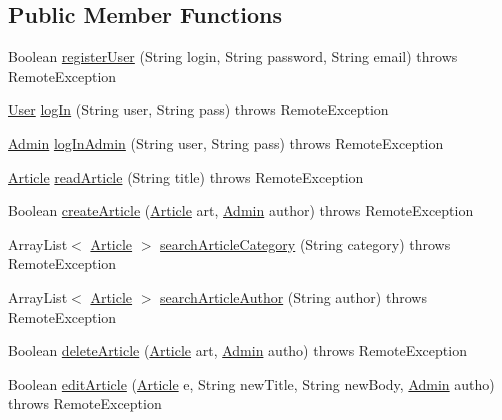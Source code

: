 \subsection*{Public Member Functions}
\begin{DoxyCompactItemize}
\item 
Boolean \hyperlink{interfacees_1_1deusto_1_1server_1_1_i_server_a3b0fbbc1c934b8e527ecfed69e497155}{register\+User} (String login, String password, String email)  throws Remote\+Exception
\item 
\hyperlink{classes_1_1deusto_1_1server_1_1jdo_1_1_user}{User} \hyperlink{interfacees_1_1deusto_1_1server_1_1_i_server_ae6b27c8714c2e2eadc9a55bccb0543fc}{log\+In} (String user, String pass)  throws Remote\+Exception
\item 
\hyperlink{classes_1_1deusto_1_1server_1_1jdo_1_1_admin}{Admin} \hyperlink{interfacees_1_1deusto_1_1server_1_1_i_server_a65588c309522410e6a6d9c27d80821a7}{log\+In\+Admin} (String user, String pass)  throws Remote\+Exception
\item 
\hyperlink{classes_1_1deusto_1_1server_1_1jdo_1_1_article}{Article} \hyperlink{interfacees_1_1deusto_1_1server_1_1_i_server_a1f02a5aa0628909b5464141923f5d1d2}{read\+Article} (String title)  throws Remote\+Exception
\item 
Boolean \hyperlink{interfacees_1_1deusto_1_1server_1_1_i_server_a74b3203c5a8d94e91004df0dc84ca386}{create\+Article} (\hyperlink{classes_1_1deusto_1_1server_1_1jdo_1_1_article}{Article} art, \hyperlink{classes_1_1deusto_1_1server_1_1jdo_1_1_admin}{Admin} author)  throws Remote\+Exception
\item 
Array\+List$<$ \hyperlink{classes_1_1deusto_1_1server_1_1jdo_1_1_article}{Article} $>$ \hyperlink{interfacees_1_1deusto_1_1server_1_1_i_server_ab08ccd2295e983571cf50431d273393a}{search\+Article\+Category} (String category)  throws Remote\+Exception
\item 
Array\+List$<$ \hyperlink{classes_1_1deusto_1_1server_1_1jdo_1_1_article}{Article} $>$ \hyperlink{interfacees_1_1deusto_1_1server_1_1_i_server_a92b587f25a7043b24d44f326d1c7b7ae}{search\+Article\+Author} (String author)  throws Remote\+Exception
\item 
Boolean \hyperlink{interfacees_1_1deusto_1_1server_1_1_i_server_ac96e072eb8a660ebcd5e535cb1324e64}{delete\+Article} (\hyperlink{classes_1_1deusto_1_1server_1_1jdo_1_1_article}{Article} art, \hyperlink{classes_1_1deusto_1_1server_1_1jdo_1_1_admin}{Admin} autho)  throws Remote\+Exception
\item 
Boolean \hyperlink{interfacees_1_1deusto_1_1server_1_1_i_server_ab5c4258f62146d90a064604891cedf2f}{edit\+Article} (\hyperlink{classes_1_1deusto_1_1server_1_1jdo_1_1_article}{Article} e, String new\+Title, String new\+Body, \hyperlink{classes_1_1deusto_1_1server_1_1jdo_1_1_admin}{Admin} autho)  throws Remote\+Exception

\end{DoxyCompactItemize}
